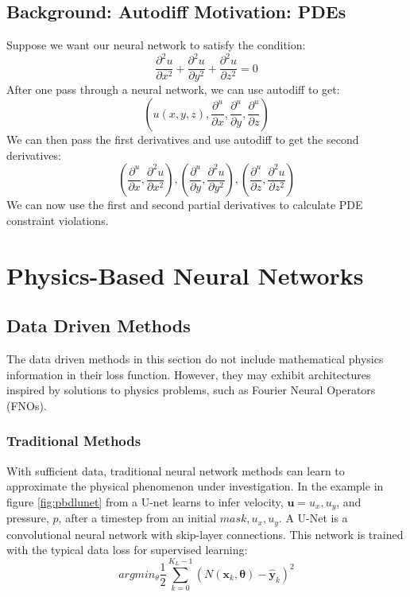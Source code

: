 \documentclass[]{article}
\begin{document}
\subsection{Background: Autodiff Motivation: PDEs}
Suppose we want our neural network to satisfy the condition:
\begin{equation}
	\frac{\partial^2u}{\partial x^2}+\frac{\partial^2u}{\partial y^2}+\frac{\partial^2u}{\partial z^2}=0
\end{equation}
After one pass through a neural network, we can use autodiff to get:
\begin{equation}
	(u(x,y,z),\frac{\partial^u}{\partial x},\frac{\partial^u}{\partial y},\frac{\partial^u}{\partial z})
\end{equation}
We can then pass the first derivatives and use autodiff to get the second derivatives:
\begin{equation}
	(\frac{\partial^u}{\partial x}, \frac{\partial^2u}{\partial x^2}), (\frac{\partial^u}{\partial y}, \frac{\partial^2u}{\partial y^2}), (\frac{\partial^u}{\partial z}, \frac{\partial^2u}{\partial z^2})
\end{equation}
We can now use the first and second partial derivatives to calculate PDE constraint violations.

\section{Physics-Based Neural Networks}
\subsection{Data Driven Methods}
The data driven methods in this section do not include mathematical physics information in their loss function.  However, they may exhibit architectures inspired by solutions to physics problems, such as Fourier Neural Operators (FNOs).
\subsubsection{Traditional Methods}
With sufficient data, traditional neural network methods can learn to approximate the physical phenomenon under investigation.  In the example in figure \ref{fig:pbdlunet} from \cite{pbdl_book} a U-net learns to infer velocity, $\textbf{u} = u_x, u_y$, and pressure, $p$, after a timestep from an initial $mask, u_x, u_y$.  A U-Net is a convolutional neural network with skip-layer connections.  This network is trained with the typical data loss for supervised learning:
\begin{equation}
arg min_\theta \frac{1}{2}\sum_{k=0}^{K_L - 1}(N(\textbf{x}_k, \boldsymbol{\theta}) - \hat{\textbf{y}}_k)^2
\end{equation}
\end{document}
